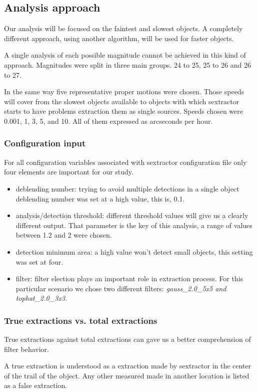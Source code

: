 \documentclass{article}
\begin{document}
\subsection{Analysis approach}
Our analysis will be focused on the faintest and slowest objects. A completely different approach, using another algorithm, will be used for faster objects.
\par
A single analysis of each possible magnitude cannot be achieved in this kind of approach. Magnitudes were split in three main groups. 24 to 25, 25 to 26 and 26 to 27.
\par
In the same way five representative proper motions were chosen. Those speeds will cover from the slowest objects available to objects with which sextractor starts to have problems extraction them as single sources. Speeds chosen were 0.001, 1, 3, 5, and 10. All of them expressed as arcseconds per hour.

\subsubsection{Configuration input}
For all configuration variables associated with sextractor configuration file only four elements are important for our study.
\begin{itemize}
\item deblending number: trying to avoid multiple detections in a single object deblending number was set at a high value, this is, 0.1.
\item analysis/detection threshold: different threshold values will give us a clearly different output. That parameter is the key of this analysis, a range of values between 1.2 and 2 were chosen. 
\item detection minimum area: a high value won't detect small objects, this setting was set at four.
\item filter: filter election plays an important role in extraction process. For this particular scenario we chose two different filters: \textit{gauss\_2.0\_5x5 and tophat\_2.0\_3x3}.
\end{itemize}

\subsubsection{True extractions vs. total extractions}
True extractions against total extractions can gave us a better comprehension of filter behavior.
\par
A true extraction is understood as a extraction made by sextractor in the center of the trail of the object. Any other measured made in another location is listed as a false extraction.
\end{document}
